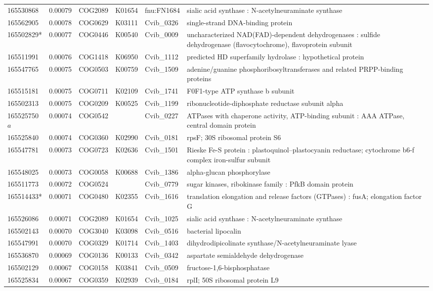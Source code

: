 \begin{landscape}
\begin{longtable}{p{1.6cm}p{1.2cm}p{1.5cm}p{1.5cm}p{2.8cm}p{13.5cm}}
165530868&0.00079&COG2089&K01654&fnu:FN1684&sialic acid synthase : N-acetylneuraminate synthase \\
165562905&0.00078&COG0629&K03111&Cvib\_0326&single-strand DNA-binding protein \\
165502829*&0.00077&COG0446&K00540&Cvib\_0009&uncharacterized NAD(FAD)-dependent dehydrogenases : sulfide dehydrogenase (flavocytochrome), flavoprotein subunit \\
165511991&0.00076&COG1418&K06950&Cvib\_1112&predicted HD superfamily hydrolase : hypothetical protein \\
165547765&0.00075&COG0503&K00759&Cvib\_1509&adenine/guanine phosphoribosyltransferases and related PRPP-binding proteins \\
165515181&0.00075&COG0711&K02109&Cvib\_1741&F0F1-type ATP synthase b subunit \\
165502313&0.00075&COG0209&K00525&Cvib\_1199&ribonucleotide-diphosphate reductase subunit alpha \\
165525750$a$&0.00074&COG0542&&Cvib\_0227&ATPases with chaperone activity, ATP-binding subunit : AAA ATPase, central domain protein \\
165525840&0.00074&COG0360&K02990&Cvib\_0181&rpsF; 30S ribosomal protein S6 \\
165547781&0.00073&COG0723&K02636&Cvib\_1501&Rieske Fe-S protein : plastoquinol--plastocyanin reductase; cytochrome b6-f complex iron-sulfur subunit \\
165548025&0.00073&COG0058&K00688&Cvib\_1386&alpha-glucan phosphorylase \\
165511773&0.00072&COG0524&&Cvib\_0779&sugar kinases, ribokinase family : PfkB domain protein \\
165514433*&0.00071&COG0480&K02355&Cvib\_1616&translation elongation and release factors (GTPases) : fusA; elongation factor G \\
165526086&0.00071&COG2089&K01654&Cvib\_1025&sialic acid synthase : N-acetylneuraminate synthase \\
165502143&0.00070&COG3040&K03098&Cvib\_0516&bacterial lipocalin \\
165547991&0.00070&COG0329&K01714&Cvib\_1403&dihydrodipicolinate synthase/N-acetylneuraminate lyase \\
165536870&0.00069&COG0136&K00133&Cvib\_0342&aspartate semialdehyde dehydrogenase \\
165502129&0.00067&COG0158&K03841&Cvib\_0509&fructose-1,6-bisphosphatase \\
165525834&0.00067&COG0359&K02939&Cvib\_0184&rplI; 50S ribosomal protein L9 \\

\end{longtable}
\end{landscape}
